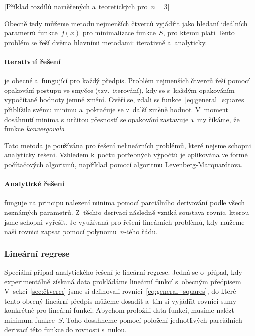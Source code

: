 [Příklad rozdílů naměřených a~teoretických pro~$n=3$]

Obecně tedy můžeme metodu nejmenších čtverců vyjádřit jako hledaní ideálních 
parametrů funkce~$f(x)$ pro minimalizace funkce~$S$, pro kterou platí
Tento problém se řeší dvěma hlavními metodami: iterativně a~analyticky.

\paragraph{Iterativní řešení} je obecné a~fungující pro každý předpis. Problém
nejmenších čtverců řeší pomocí opakování postupu ve smyčce (tzv.~iterování),
kdy se s~každým opakováním vypočítané hodnoty jemně změní. Ověří se, zdali se
funkce~\eqref{eq:general_squares} přiblížila svému minimu a~pokračuje se
v~další změně hodnot. V~moment dosáhnutí minima s~určitou přesností se
opakování zastavuje a~my říkáme, že funkce \emph{konvergovala}.

Tato metoda je používána pro řešení nelineárních problémů, které nejsme schopni
analyticky řešení. Vzhledem k~počtu potřebných výpočtů je aplikována ve formě
počítačových algoritmů, například pomocí algoritmu Levenberg-Marquardtova.

\paragraph{Analytické řešení} funguje na principu nalezení minima pomocí
parciálního derivování podle všech neznámých parametrů. Z~těchto derivací
následně vzniká soustava rovnic, kterou jsme schopni vyřešit. Je využívaná pro
řešení lineárních problémů, kdy můžeme naší rovnici zapsat  pomocí
polynomu~$n$-tého řádu.


\subsubsection{Lineární regrese}
Speciální případ analytického řešení je lineární regrese. Jedná se o~případ,
kdy experimentálně získaná data prokládáme lineární funkcí s~obecným předpisem
V~sekci~\ref{sec:čtverce} jsme si definovali rovnici~\eqref{eq:general_squares},
do které tento obecný lineární předpis můžeme dosadit a~tím si vyjádřit rovnici
sumy konkrétně pro lineární funkci:
Abychom proložili data funkcí, musíme nalézt minimum funkce~$S$. Toho dosáhneme
pomocí položení jednotlivých parciálních derivací této funkce do rovnosti
s~nulou.~\cite{wolfram} 

